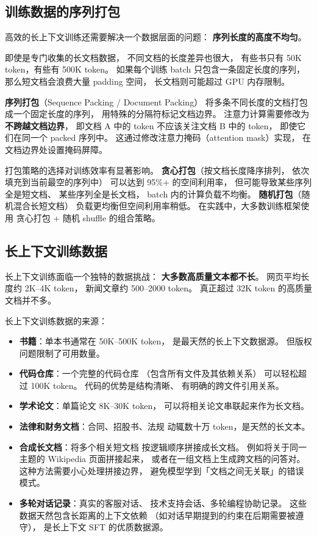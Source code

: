 \subsection{训练数据的序列打包}

高效的长上下文训练还需要解决一个数据层面的问题：
\textbf{序列长度的高度不均匀}。

即使是专门收集的长文档数据，
不同文档的长度差异也很大，
有些书只有 50K token，有些有 500K token。
如果每个训练 batch 只包含一条固定长度的序列，
那么短文档会浪费大量 padding 空间，
长文档则可能超过 GPU 内存限制。

\textbf{序列打包}（Sequence Packing / Document Packing）
将多条不同长度的文档打包成一个固定长度的序列，
用特殊的分隔符标记文档边界。
注意力计算需要修改为\textbf{不跨越文档边界}，
即文档 A 中的 token 不应该关注文档 B 中的 token，
即使它们在同一个 packed 序列中。
这通过修改注意力掩码（attention mask）实现，
在文档边界处设置掩码屏障。

打包策略的选择对训练效率有显著影响。
\textbf{贪心打包}（按文档长度降序排列，
依次填充到当前最空的序列中）
可以达到 95\%+ 的空间利用率，
但可能导致某些序列全是短文档、
某些序列全是长文档，
batch 内的计算负载不均衡。
\textbf{随机打包}（随机混合长短文档）
负载更均衡但空间利用率稍低。
在实践中，大多数训练框架使用
贪心打包 + 随机 shuffle 的组合策略。

\subsection{长上下文训练数据}

长上下文训练面临一个独特的数据挑战：
\textbf{大多数高质量文本都不长}。
网页平均长度约 2K--4K token，
新闻文章约 500--2000 token。
真正超过 32K token 的高质量文档并不多。

长上下文训练数据的来源：
\begin{itemize}[noitemsep]
  \item \textbf{书籍}：单本书通常在 50K--500K token，
        是最天然的长上下文数据源。
        但版权问题限制了可用数量。
  \item \textbf{代码仓库}：一个完整的代码仓库
        （包含所有文件及其依赖关系）
        可以轻松超过 100K token。
        代码的优势是结构清晰、
        有明确的跨文件引用关系。
  \item \textbf{学术论文}：单篇论文 8K--30K token，
        可以将相关论文串联起来作为长文档。
  \item \textbf{法律和财务文档}：合同、招股书、法规
        动辄数十万 token，是天然的长文本。
  \item \textbf{合成长文档}：将多个相关短文档
        按逻辑顺序拼接成长文档。
        例如将关于同一主题的 Wikipedia 页面拼接起来，
        或者在一组文档上生成跨文档的问答对。
        这种方法需要小心处理拼接边界，
        避免模型学到「文档之间无关联」的错误模式。
  \item \textbf{多轮对话记录}：真实的客服对话、
        技术支持会话、多轮编程协助记录。
        这些数据天然包含长距离的上下文依赖
        （如对话早期提到的约束在后期需要被遵守），
        是长上下文 SFT 的优质数据源。
\end{itemize}

